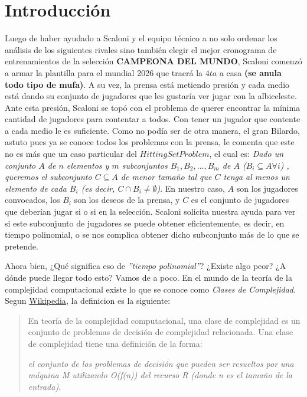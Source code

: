 \section{Introducción}

Luego de haber ayudado a Scaloni y el equipo técnico a no solo ordenar los análisis de los siguientes rivales sino también elegir el mejor cronograma de entrenamientos de la selección \textbf{CAMPEONA DEL MUNDO}, Scaloni comenzó a armar la plantilla para el mundial 2026 que traerá la $4ta$ a casa \textbf{(se anula todo tipo de mufa)}. A su vez, la prensa está metiendo presión y cada medio está dando su conjunto de jugadores que les gustaría ver jugar con la albiceleste. Ante esta presión, Scaloni se topó con el problema de querer encontrar la mínima cantidad de jugadores para contentar a todos. Con tener un jugador que contente a cada medio le es suficiente.
Como no podía ser de otra manera, el gran Bilardo, astuto pues ya se conoce todos los problemas con la prensa, le comenta que este no es más que un caso particular del $Hitting Set Problem$, el cual es:
\textit{Dado un conjunto $A$ de $n$ elementos y $m$ subconjuntos $B_1, B_2, ..., B_m$ de $A$ ($B_i \subseteq A \forall i$) , queremos el subconjunto $C \subseteq A$ de menor tamaño tal que $C$ tenga al menos un elemento de cada $B_i$ (es decir, $C \cap B_i \neq \emptyset$)}.
En nuestro caso, $A$ son los jugadores convocados, los $B_i$ son los deseos de la prensa, y $C$ es el conjunto de jugadores que deberían jugar si o si en la selección.
Scaloni solicita nuestra ayuda para ver si este subconjunto de jugadores se puede obtener eficientemente, es decir, en tiempo polinomial, o se nos complica obtener dicho subconjunto más de lo que se pretende.

Ahora bien, ¿Qué significa eso de \textit{''tiempo polinomial''}? ¿Existe algo peor? ¿A dónde puede llegar todo esto? Vamos de a poco.
En el mundo de la teoría de la complejidad computacional existe lo que se conoce como \textit{Clases de Complejidad}. Segun \href{https://es.wikipedia.org/wiki/Clase_de_complejidad}{Wikipedia}, la definicion es la siguiente:
\begin{quote}
En teoría de la complejidad computacional, una clase de complejidad es un conjunto de problemas de decisión de complejidad relacionada. Una clase de complejidad tiene una definición de la forma:

\textit{el conjunto de los problemas de decisión que pueden ser resueltos por una máquina M utilizando O(f(n)) del recurso R (donde n es el tamaño de la entrada)}.
\end{quote}

